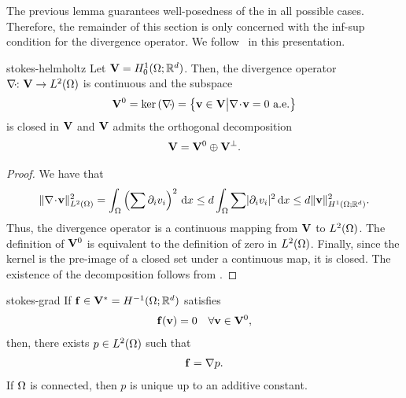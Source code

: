 \begin{intro}
  The previous lemma guarantees well-posedness of the
   in all possible cases. Therefore, the
  remainder of this section is only concerned with the inf-sup
  condition for the divergence operator. We
  follow~\cite{GiraultRaviart86} in this presentation.
\end{intro}

\begin{Lemma}{stokes-helmholtz}
  Let $\mathbf V=H^1_0(\Omega;\mathbb R^d)$. Then, the divergence operator
  $\nabla\!\cdot\!\colon \mathbf V \to L^2(\Omega)$ is continuous and the subspace
  \begin{gather}
    \mathbf V^0 = \operatorname{ker}\left(\nabla\!\cdot\!\right)
    = \bigl\{\mathbf v\in \mathbf V \big|
    \nabla\!\cdot\! \mathbf v = 0 \text{ a.e.} \bigr\}
  \end{gather}
  is closed in $\mathbf V$ and $\mathbf V$ admits the orthogonal decomposition
  \begin{gather}
    \mathbf V = \mathbf V^0\oplus \mathbf V^\perp.
  \end{gather}
\end{Lemma}

\begin{proof}
  We have that
  \begin{gather}
    \lVert\nabla\!\cdot\! \mathbf v\rVert_{L^2(\Omega)}^2
    = \int_\Omega \left(\sum \partial_iv_i\right)^2\,\mathrm{d} x
    \le d \int_\Omega \sum \lvert\partial_iv_i\rvert^2\,\mathrm{d} x
    \le d \lVert\mathbf v\rVert_{H^1(\Omega;\mathbb R^d)}^2.
  \end{gather}
  Thus, the divergence operator is a continuous mapping from $\mathbf V$ to
  $L^2(\Omega)$. The definition of $\mathbf V^0$ is equivalent to the
  definition of zero in $L^2(\Omega)$. Finally, since the kernel is
  the pre-image of a closed set under a continuous map, it is
  closed. The existence of the decomposition follows from
  .
\end{proof}

\begin{Lemma}{stokes-grad}
  If $\mathbf f\in \mathbf V^* = H^{-1}(\Omega;\mathbb R^d)$ satisfies
  \begin{gather}
    \mathbf f(\mathbf v) = 0 \quad\forall \mathbf v\in \mathbf V^0,
  \end{gather}
  then, there exists $p\in L^2(\Omega)$ such that
  \begin{gather}
    \mathbf f = \nabla p.
  \end{gather}
  If $\Omega$ is connected, then $p$ is unique up to an additive
  constant.
\end{Lemma}

